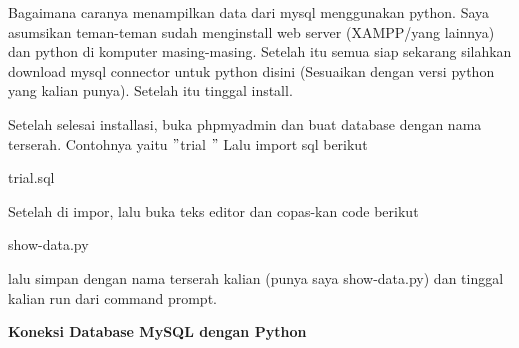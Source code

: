  \par
Bagaimana caranya menampilkan data dari mysql menggunakan python. Saya asumsikan teman-teman sudah menginstall web server (XAMPP/yang lainnya) dan python di komputer masing-masing. Setelah itu semua siap sekarang silahkan download mysql connector untuk python disini (Sesuaikan dengan versi python yang kalian punya). Setelah itu tinggal install. \par
Setelah selesai installasi, buka phpmyadmin dan buat database dengan nama terserah. Contohnya yaitu  $ " $trial $ " $ Lalu import sql berikut \par
\noindent 
trial.sql \par
\noindent 
Setelah di impor, lalu buka teks editor dan copas-kan code berikut \par
\noindent 
show-data.py \par
\noindent 
lalu simpan dengan nama terserah kalian (punya saya show-data.py) dan tinggal kalian run dari command prompt. \par
\vspace{12pt}
\noindent 
\textbf{Koneksi Database MySQL dengan Python} \par
\noindent 
